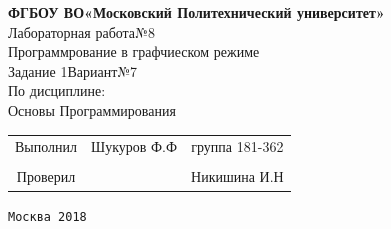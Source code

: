 \documentclass[a4paper]{article}
\begin{document}
\begin{center}
\hfill \break
\large{\textbf{ФГБОУ ВО«Московский Политехнический университет»}}\\
\hfill \break
\hfill \break
\hfill \break
\hfill \break
\hfill \break
\hfill \break
\hfill \break
\large{Лабораторная работа№8}\\
\footnotesize{Программрование в графчиеском режиме\\
Задание 1\hspace{3cm}Вариант№7\break\\
По дисциплине:\\
Основы Программирования
}
\end{center}
\hfill \break
\hfill \break
\hfill \break
\hfill \break
\hfill \break
\hfill \break
\hfill \break
\hfill \break
\hfill \break
\hfill \break
\normalsize{ 
\begin{tabular}{ccc}
\hspace{4cm}Выполнил & Шукуров Ф.Ф  & группа 181-362\\
\\
\hspace{4cm}Проверил & \underline{\hspace{3cm}}& Никишина И.Н
\end{tabular}
}
\hfill \break
\hfill \break
\hfill \break
\hfill \break
\hfill \break
\hfill \break
\hfill \break
\hfill \break
\hfill \break
\hfill \break
\hfill \break
\hfill \break
\begin{center}\texttt{Москва 2018}\end{center}
\thispagestyle{empty}
\end{document}
